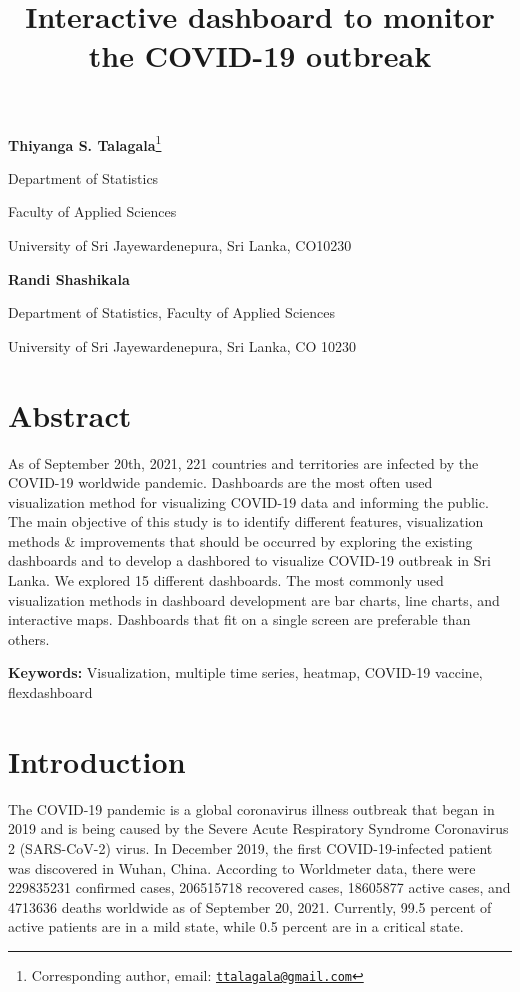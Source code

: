 \documentclass[
]{article}
\title{Interactive dashboard to monitor the COVID-19 outbreak}
\author{}
\date{\vspace{-2.5em}}
\begin{document}
\maketitle

\textbf{Thiyanga S. Talagala}\footnote{Corresponding author, email:
  \href{mailto:ttalagala@gmail.com}{\nolinkurl{ttalagala@gmail.com}}}

Department of Statistics

Faculty of Applied Sciences

University of Sri Jayewardenepura, Sri Lanka, CO10230

\hspace{3cm}

\textbf{Randi Shashikala}

Department of Statistics, Faculty of Applied Sciences

University of Sri Jayewardenepura, Sri Lanka, CO 10230

\hypertarget{abstract}{%
\section{Abstract}\label{abstract}}

As of September 20th, 2021, 221 countries and territories are infected
by the COVID-19 worldwide pandemic. Dashboards are the most often used
visualization method for visualizing COVID-19 data and informing the
public. The main objective of this study is to identify different
features, visualization methods \& improvements that should be occurred
by exploring the existing dashboards and to develop a dashbored to
visualize COVID-19 outbreak in Sri Lanka. We explored 15 different
dashboards. The most commonly used visualization methods in dashboard
development are bar charts, line charts, and interactive maps.
Dashboards that fit on a single screen are preferable than others.

\textbf{Keywords:} Visualization, multiple time series, heatmap,
COVID-19 vaccine, flexdashboard

\hypertarget{introduction}{%
\section{Introduction}\label{introduction}}

The COVID-19 pandemic is a global coronavirus illness outbreak that
began in 2019 and is being caused by the Severe Acute Respiratory
Syndrome Coronavirus 2 (SARS-CoV-2) virus. In December 2019, the first
COVID-19-infected patient was discovered in Wuhan, China. According to
Worldmeter data, there were 229835231 confirmed cases, 206515718
recovered cases, 18605877 active cases, and 4713636 deaths worldwide as
of September 20, 2021. Currently, 99.5 percent of active patients are in
a mild state, while 0.5 percent are in a critical state.
\end{document}
